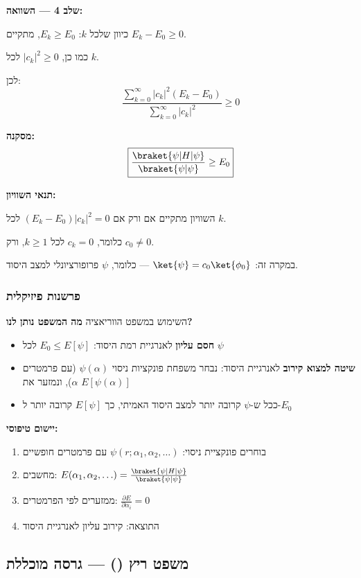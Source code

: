 \textbf{שלב 4 — השוואה:}

כיוון שלכל $k$: $E_k \geq E_0$, מתקיים $E_k - E_0 \geq 0$.

כמו כן, $|c_k|^2 \geq 0$ לכל $k$.

לכן:
\[
\frac{\sum_{k=0}^{\infty} |c_k|^2 (E_k - E_0)}{\sum_{k=0}^{\infty} |c_k|^2} \geq 0
\]

\textbf{מסקנה:}
\[
\boxed{\frac{\braket{\psi|H|\psi}}{\braket{\psi|\psi}} \geq E_0}
\]

\textbf{תנאי השוויון:}

השוויון מתקיים אם ורק אם $(E_k - E_0) |c_k|^2 = 0$ לכל $k$.

כלומר, $c_k = 0$ לכל $k \geq 1$, ורק $c_0 \neq 0$.

במקרה זה: $\ket{\psi} = c_0 \ket{\phi_0}$ — כלומר, $\psi$ פרופורציונלי למצב היסוד.

\subsubsection*{פרשנות פיזיקלית}

\begin{importantbox}{השימוש במשפט הווריאציה}
\textbf{מה המשפט נותן לנו?}
\begin{itemize}
    \item \textbf{חסם עליון} לאנרגיית רמת היסוד: $E_0 \leq E[\psi]$ לכל $\psi$
    \item \textbf{שיטה למצוא קירוב} לאנרגיית היסוד: נבחר משפחת פונקציות ניסוי $\psi(\alpha)$ (עם פרמטרים $\alpha$), ונמזער את $E[\psi(\alpha)]$
    \item ככל ש-$\psi$ קרובה יותר למצב היסוד האמיתי, כך $E[\psi]$ קרובה יותר ל-$E_0$
\end{itemize}

\textbf{יישום טיפוסי:}
\begin{enumerate}
    \item בוחרים פונקציית ניסוי: $\psi(r; \alpha_1, \alpha_2, \ldots)$ עם פרמטרים חופשיים
    \item מחשבים: $E(\alpha_1, \alpha_2, \ldots) = \frac{\braket{\psi|H|\psi}}{\braket{\psi|\psi}}$
    \item ממזערים לפי הפרמטרים: $\frac{\partial E}{\partial \alpha_i} = 0$
    \item התוצאה: קירוב עליון לאנרגיית היסוד
\end{enumerate}
\end{importantbox}

\subsection{משפט ריץ () — גרסה מוכללת}

